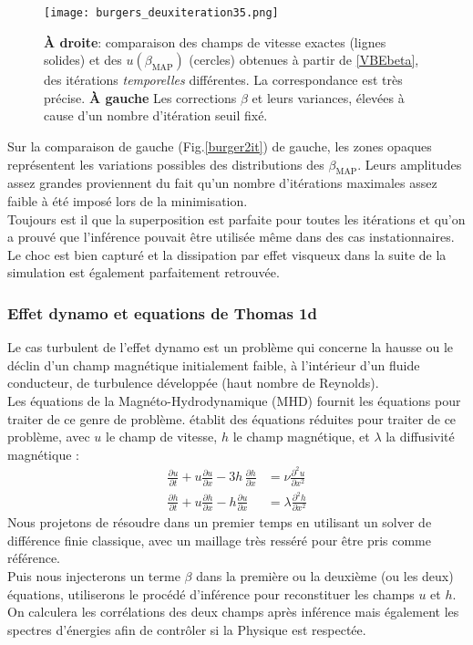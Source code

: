 \documentclass[a4paper,12pt]{article}
\newcommand{\bepar}[1]{
	\left( #1 \right)  
}
\newcommand{\bmap}{\beta_{\text{MAP}}}
\newcommand\bk{\color{black}}
\newcommand\dsb{\color{dsb}}
\numberwithin{equation}{section} %
\begin{document}
\begin{figure}[!ht]
\vspace{-5mm}
\centering
\texttt{[image: burgers\_deuxiteration35.png]}
\caption{\small{\textbf{À droite}: comparaison des champs de vitesse exactes (lignes solides) et des $u\bepar{\bmap}$ (cercles) obtenues à partir de \eqref{VBEbeta}, des itérations \textit{temporelles} différentes. La correspondance est très précise. \textbf{À gauche} Les corrections $\beta$ et leurs variances, élevées à cause d'un nombre d'itération seuil fixé.}}
\label{burger2it}
\end{figure}
\noindent Sur la comparaison de gauche (Fig.\eqref{burger2it}) de gauche, les zones opaques représentent les variations possibles des distributions des $\bmap$. Leurs amplitudes assez grandes proviennent du fait qu'un nombre d'itérations maximales assez faible à été imposé lors de la minimisation.\\ 
Toujours est il que la superposition est parfaite pour toutes les itérations et qu'on a prouvé que l'inférence pouvait être utilisée même dans des cas instationnaires.\\
Le choc est bien capturé et la dissipation par effet visqueux dans la suite de la simulation est également parfaitement retrouvée.

\dsb \subsubsection{Effet dynamo et equations de Thomas 1d} \bk
\noindent Le cas turbulent de l'effet dynamo est un problème qui concerne la hausse ou le déclin d'un champ magnétique initialement faible, à l'intérieur d'un fluide conducteur, de turbulence développée (haut nombre de Reynolds).\\
Les équations de la Magnéto-Hydrodynamique (MHD) fournit les équations pour traiter de ce genre de problème. \cite{thomas1968numerical} établit des équations réduites pour traiter de ce problème, avec $u$ le champ de vitesse, $h$ le champ magnétique, et $\lambda$ la diffusivité magnétique : 
\begin{align}
\frac{\partial u}{\partial t} + u \frac{\partial u}{\partial x} -3h\, \frac{\partial h}{\partial x} &= \nu \frac{\partial^2 u}{\partial x^2} \label{uthomas} \\[3mm]
\frac{\partial h}{\partial t} + u \frac{\partial h}{\partial x} - h \frac{\partial u}{\partial x} &= \lambda \frac{\partial^2 h}{\partial x^2} 
\end{align}
Nous projetons de résoudre dans un premier temps en utilisant un solver de différence finie classique, avec un maillage très resséré pour être pris comme référence.\\
Puis nous injecterons un terme $\beta$ dans la première ou la deuxième (ou les deux) équations, utiliserons le procédé d'inférence pour reconstituer les champs $u$ et $h$.\\ On calculera les corrélations des deux champs après inférence mais également les spectres d'énergies afin de contrôler si la Physique est respectée.\\
\end{document}
